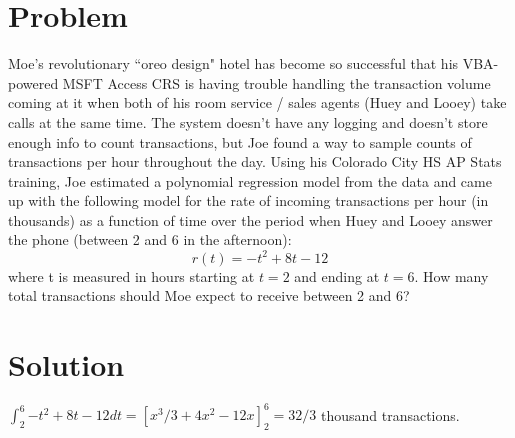 \documentclass[11pt,a4paper]{report}
\theoremstyle{plain}
\theoremstyle{definition}
\theoremstyle{remark}
\begin{document}
\section*{Problem}
Moe's revolutionary ``oreo design" hotel has become so successful that his VBA-powered MSFT Access CRS is having trouble handling the transaction volume coming at it when both of his room service / sales agents (Huey and Looey) take calls at the same time.  The system doesn't have any logging and doesn't store enough info to count transactions, but Joe found a way to sample counts of transactions per hour throughout the day.  Using his Colorado City HS AP Stats training, Joe estimated a polynomial regression model from the data and came up with the following model for the rate of incoming transactions per hour (in thousands) as a function of time over the period when Huey and Looey answer the phone (between 2 and 6 in the afternoon):
$$r(t) = -t^2 +8t - 12$$
where t is measured in hours starting at $t = 2$ and ending at $t = 6$.  How many total transactions should Moe expect to receive between 2 and 6?

\newpage
\section*{Solution}
$\int_{2}^{6}{-t^2 + 8t - 12}dt = \left[x^3/3 + 4x^2 - 12x\right]_2^6 = 32/3$ thousand transactions.
\end{document}
